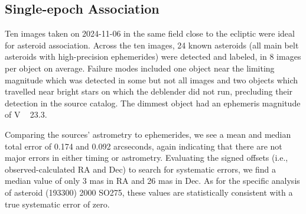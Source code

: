 \subsection{Single-epoch Association}
\label{sec:association}

Ten images taken on 2024-11-06 in the same field close to the ecliptic were ideal for asteroid association. Across the ten images, 24 known asteroids (all main belt asteroids with high-precision ephemerides) were detected and labeled, in 8 images per object on average. Failure modes included one object near the limiting magnitude which was detected in some but not all images and two objects which travelled near bright stars on which the deblender did not run, precluding their detection in the source catalog. The dimmest object had an ephemeris magnitude of V ~ 23.3. 

Comparing the sources' astrometry to ephemerides,  we see a mean and median total error of 0.174 and 0.092 arcseconds, again indicating that there are not major errors in either timing or astrometry. Evaluating the signed offsets (i.e., observed-calculated RA and Dec) to search for systematic errors, we find a median value of only 3 mas in RA and 26 mas in Dec. As for the specific analysis of asteroid (193300) 2000 SO275, these values are statistically consistent with a true systematic error of zero.





